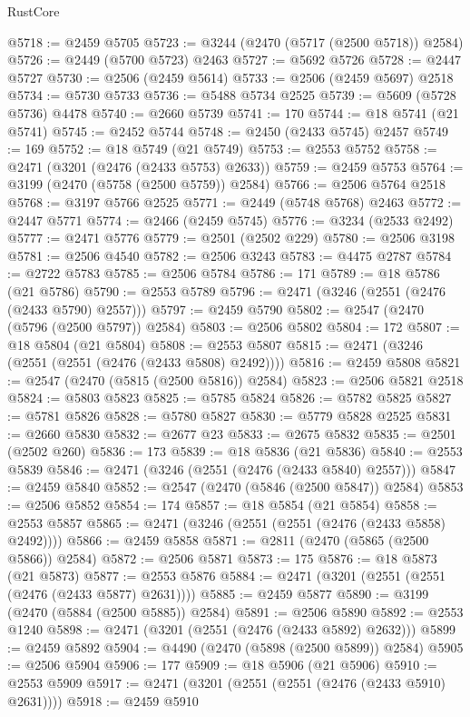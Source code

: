 \begin{lexlean}{RustCore}
\begin{coremodule}
@5718 := @2459 @5705
@5723 := @3244 (@2470 (@5717 (@2500 @5718)) @2584)
@5726 := @2449 (@5700 @5723) @2463
@5727 := @5692 @5726
@5728 := @2447 @5727
@5730 := @2506 (@2459 @5614)
@5733 := @2506 (@2459 @5697) @2518
@5734 := @5730 @5733
@5736 := @5488 @5734 @2525
@5739 := @5609 (@5728 @5736) @4478
@5740 := @2660 @5739
@5741 := 170
@5744 := @18 @5741 (@21 @5741)
@5745 := @2452 @5744
@5748 := @2450 (@2433 @5745) @2457
@5749 := 169
@5752 := @18 @5749 (@21 @5749)
@5753 := @2553 @5752
@5758 := @2471 (@3201 (@2476 (@2433 @5753) @2633))
@5759 := @2459 @5753
@5764 := @3199 (@2470 (@5758 (@2500 @5759)) @2584)
@5766 := @2506 @5764 @2518
@5768 := @3197 @5766 @2525
@5771 := @2449 (@5748 @5768) @2463
@5772 := @2447 @5771
@5774 := @2466 (@2459 @5745)
@5776 := @3234 (@2533 @2492)
@5777 := @2471 @5776
@5779 := @2501 (@2502 @229)
@5780 := @2506 @3198
@5781 := @2506 @4540
@5782 := @2506 @3243
@5783 := @4475 @2787
@5784 := @2722 @5783
@5785 := @2506 @5784
@5786 := 171
@5789 := @18 @5786 (@21 @5786)
@5790 := @2553 @5789
@5796 := @2471 (@3246 (@2551 (@2476 (@2433 @5790) @2557)))
@5797 := @2459 @5790
@5802 := @2547 (@2470 (@5796 (@2500 @5797)) @2584)
@5803 := @2506 @5802
@5804 := 172
@5807 := @18 @5804 (@21 @5804)
@5808 := @2553 @5807
@5815 := @2471 (@3246 (@2551 (@2551 (@2476 (@2433 @5808) @2492))))
@5816 := @2459 @5808
@5821 := @2547 (@2470 (@5815 (@2500 @5816)) @2584)
@5823 := @2506 @5821 @2518
@5824 := @5803 @5823
@5825 := @5785 @5824
@5826 := @5782 @5825
@5827 := @5781 @5826
@5828 := @5780 @5827
@5830 := @5779 @5828 @2525
@5831 := @2660 @5830
@5832 := @2677 @23
@5833 := @2675 @5832
@5835 := @2501 (@2502 @260)
@5836 := 173
@5839 := @18 @5836 (@21 @5836)
@5840 := @2553 @5839
@5846 := @2471 (@3246 (@2551 (@2476 (@2433 @5840) @2557)))
@5847 := @2459 @5840
@5852 := @2547 (@2470 (@5846 (@2500 @5847)) @2584)
@5853 := @2506 @5852
@5854 := 174
@5857 := @18 @5854 (@21 @5854)
@5858 := @2553 @5857
@5865 := @2471 (@3246 (@2551 (@2551 (@2476 (@2433 @5858) @2492))))
@5866 := @2459 @5858
@5871 := @2811 (@2470 (@5865 (@2500 @5866)) @2584)
@5872 := @2506 @5871
@5873 := 175
@5876 := @18 @5873 (@21 @5873)
@5877 := @2553 @5876
@5884 := @2471 (@3201 (@2551 (@2551 (@2476 (@2433 @5877) @2631))))
@5885 := @2459 @5877
@5890 := @3199 (@2470 (@5884 (@2500 @5885)) @2584)
@5891 := @2506 @5890
@5892 := @2553 @1240
@5898 := @2471 (@3201 (@2551 (@2476 (@2433 @5892) @2632)))
@5899 := @2459 @5892
@5904 := @4490 (@2470 (@5898 (@2500 @5899)) @2584)
@5905 := @2506 @5904
@5906 := 177
@5909 := @18 @5906 (@21 @5906)
@5910 := @2553 @5909
@5917 := @2471 (@3201 (@2551 (@2551 (@2476 (@2433 @5910) @2631))))
@5918 := @2459 @5910

\end{coremodule}
\end{lexlean}
